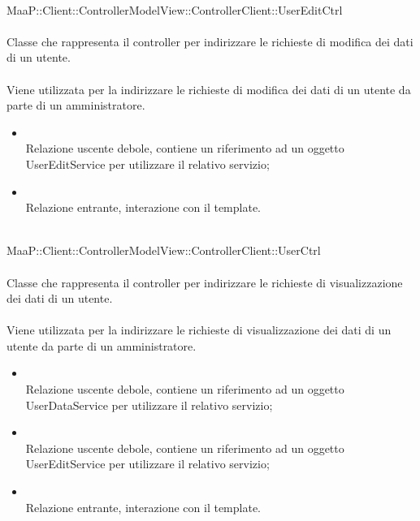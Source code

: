 \\
MaaP::Client::ControllerModelView::ControllerClient::UserEditCtrl\\
\\
Classe che rappresenta il controller per indirizzare le richieste di modifica dei dati di un utente.\\
\\
Viene utilizzata per la indirizzare le richieste di modifica dei dati di un utente da parte di un amministratore.\\
\begin{itemize}
\item{}\\
Relazione uscente debole, contiene un riferimento ad un oggetto UserEditService per utilizzare il relativo servizio;
\item{}\\
Relazione entrante, interazione con il template.
\end{itemize}

\\
MaaP::Client::ControllerModelView::ControllerClient::UserCtrl\\
\\
Classe che rappresenta il controller per indirizzare le richieste di visualizzazione dei dati di un utente.\\
\\
Viene utilizzata per la indirizzare le richieste di visualizzazione dei dati di un utente da parte di un amministratore.\\
\begin{itemize}
\item{}\\
Relazione uscente debole, contiene un riferimento ad un oggetto UserDataService per utilizzare il relativo servizio;
\item{}\\
Relazione uscente debole, contiene un riferimento ad un oggetto UserEditService per utilizzare il relativo servizio;
\item{}\\
Relazione entrante, interazione con il template.
\end{itemize}

